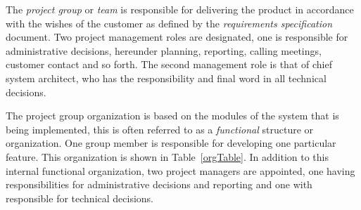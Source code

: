 The \emph{project group} or \emph{team} is responsible for delivering the product in accordance with the wishes of the customer as defined by the \emph{requirements specification} document. Two project management roles are designated, one is responsible for administrative decisions, hereunder planning, reporting, calling meetings, customer contact and so forth. The second management role is that of chief system architect, who has the responsibility and final word in all technical decisions.

The project group organization is based on the modules of the system that is being implemented, this is often referred to as a \emph{functional} structure or organization. One group member is responsible for developing one particular feature. This organization is shown in Table~\ref{orgTable}. In addition to this internal functional organization, two project managers are appointed, one having responsibilities for administrative decisions and reporting and one with responsible for technical decisions.

